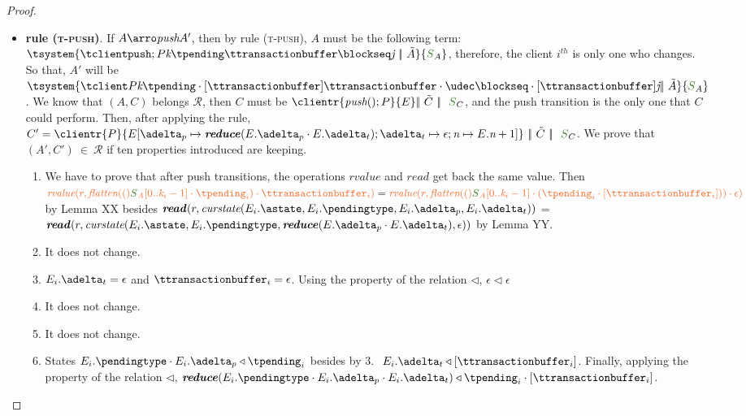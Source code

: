 \documentclass[envcountsect,runningheads,orivec]{llncs}
\begin{document}
\begin{proof}
\begin{itemize}
\begin{itemize}
\item {\bf rule (\textsc{t-push})}. If $A \arroi{\pushtran} A'$, then by rule (\textsc{\footnotesize{t-push}}), $A$ must be the following term: $ \tsystem{\tclienti{\tpushins}{\tknown}{\tpending}{\ttransactionbuffer}{\tsent}{\treceivebuffer}\ \bigpar\ \tilde{A}}{\queuemessage_A}$, therefore, the client $i^{th}$ is only one who changes. So that, $A'$ will be $\tsystem{\tclienti{\tprogram}{\tknown}{\tpending \cdot [\ttransactionbuffer]}{\ttransactionbuffer \cdot \tupdate}{\tsent \cdot [\ttransactionbuffer]}{\treceivebuffer}\bigpar\ \tilde{A}}{\queuemessage_A}$. We know that $(A,C)$ belongs $\mathcal{R}$, then $C$ must be $\clientr{\pushins}{\stateclient} \bigpar\ \tilde{C} \ \bigpar\ \ \queuemessage_C$, and the push transition is the only one that $C$ could perform. Then, after applying the rule, $C' = \clientr{P}{\updatethree{E}{\pushbuffer}{\reduce{E.\pushbuffer\cdot E.\transactionbuffer}}{\transactionbuffer}{\epsilon}{\nround}{E.\nround+1}}\ \bigpar\ \tilde{C} \ \bigpar\ \ \queuemessage_C$. We prove that $(A',C') \ \in \ \mathcal{R}$ if ten properties introduced are keeping.					
						\begin{enumerate}
							\item We have to prove that after push transitions, the operations $rvalue$ and $read$ get back the same value. Then $\rvalue{r}{\flatten(\queuemessage_{A}[0..\tknown_i-1] \cdot \tpending_i) \cdot \ttransactionbuffer_i} = \rvalue{r}{\flatten(\queuemessage_{A}[0..\tknown_i-1] \cdot (\tpending_i \cdot [\ttransactionbuffer_i])) \cdot \epsilon}$ by Lemma XX besides $\readp{r}{\curstate{E_{i}.\known}{E_{i}.\pending}{E_{i}.\pushbuffer}{E_{i}.\transactionbuffer}}$ = $
						\readp{r}{\curstate{E_{i}.\known}{E_{i}.\pending}{ \reduce{E.\pushbuffer\cdot E.\transactionbuffer}}{\epsilon}}$ by Lemma YY.
							\item It does not change.
							\item $E_{i}.\transactionbuffer = \epsilon$ and $\ttransactionbuffer_i = \epsilon$. Using the property of the relation $\triangleleft$, $\epsilon \triangleleft \epsilon$ 
							\item It does not change.
							\item It does not change.
							\item States $E_{i}.\pending \cdot E_{i}.\pushbuffer \triangleleft \tpending_i$ besides by 3. $\ E_{i}.\transactionbuffer \triangleleft [\ttransactionbuffer_i]$. Finally, applying the property of the relation $\triangleleft$, $\reduce{E_i.\pending \cdot E_i.\pushbuffer \cdot E_i.\transactionbuffer} \triangleleft \tpending_i \cdot [\ttransactionbuffer_i]$.

\end{enumerate}
\end{itemize}
\end{itemize}
\end{proof}
\end{document}
